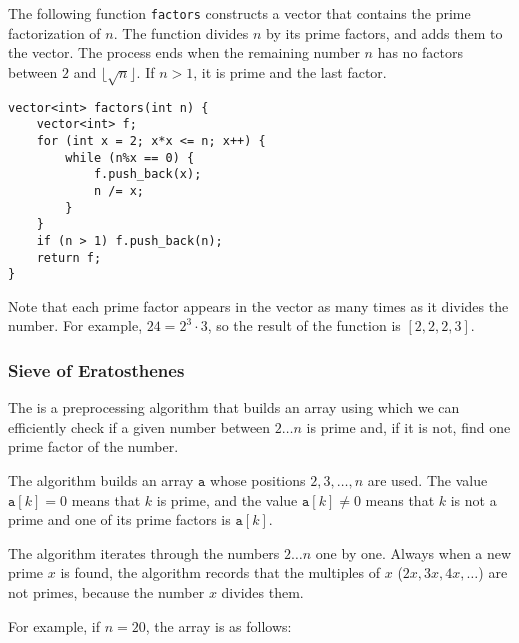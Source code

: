 \noindent
The following function \texttt{factors}
constructs a vector that contains the prime
factorization of $n$.
The function divides $n$ by its prime factors,
and adds them to the vector.
The process ends when the remaining number $n$
has no factors between $2$ and $\lfloor \sqrt n \rfloor$.
If $n>1$, it is prime and the last factor.

\begin{lstlisting}
vector<int> factors(int n) {
    vector<int> f;
    for (int x = 2; x*x <= n; x++) {
        while (n%x == 0) {
            f.push_back(x);
            n /= x;
        }
    }
    if (n > 1) f.push_back(n);
    return f;
}
\end{lstlisting}

Note that each prime factor appears in the vector
as many times as it divides the number.
For example, $24=2^3 \cdot 3$,
so the result of the function is $[2,2,2,3]$.

\subsubsection{Sieve of Eratosthenes}


The  is a preprocessing
algorithm that builds an array using which we
can efficiently check if a given number between $2 \ldots n$
is prime and, if it is not, find one prime factor of the number.

The algorithm builds an array $\texttt{a}$
whose positions $2,3,\ldots,n$ are used.
The value $\texttt{a}[k]=0$ means
that $k$ is prime,
and the value $\texttt{a}[k] \neq 0$
means that $k$ is not a prime and one
of its prime factors is $\texttt{a}[k]$.

The algorithm iterates through the numbers
$2 \ldots n$ one by one.
Always when a new prime $x$ is found,
the algorithm records that the multiples
of $x$ ($2x,3x,4x,\ldots$) are not primes,
because the number $x$ divides them.

For example, if $n=20$, the array is as follows:

